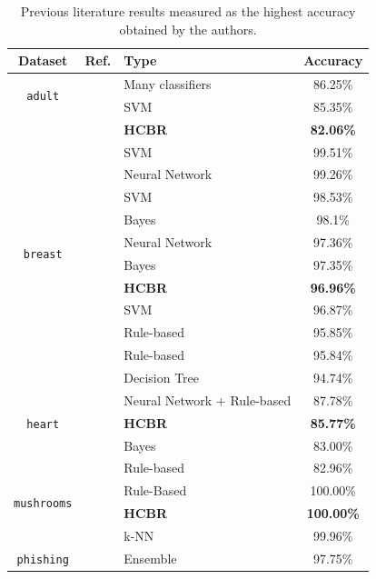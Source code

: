 \documentclass[sigconf,edbt]{acmart-edbt-workshops}
\def\bfHCBR{{\sc \bf HCBR}}
\begin{document}
\begin{table}[tb]
\begin{center}
  \caption{Previous literature results measured as the highest accuracy obtained by the authors.}
  \begin{small}
\begin{tabular}{|c|c|l|c|}
\hline
 Dataset & Ref. & Type & Accuracy   \\ \hline
\multirow{2}{*}{\texttt{adult}} & \cite{kou2012evaluation} & Many classifiers &  86.25\% \\
& \cite{Lee2001} & SVM & 85.35\% \\ 
& & \bfHCBR & {\bf 82.06\%} \\ \hline
 \multirow{10}{*}{\texttt{breast}} & \cite{akay2009support}  & SVM & 99.51\% \\ 
 & \cite{MARCANOCEDENO20119573} & Neural Network & 99.26\% \\ 
 & \cite{POLAT2007694} & SVM & 98.53\% \\ 
 & \cite{fallahi2011expert} & Bayes & 98.1\% \\ 
 & \cite{ubeyli2007implementing} & Neural Network & 97.36\% \\ 
 & \cite{Jiang:2012:LIW:2124637.2124641} & Bayes & 97.35\% \\ 
 & & {\bf \bfHCBR} & {\bf 96.96\%} \\
 & \cite{CHEN20119014} & SVM & 96.87\% \\
 & \cite{doi:10.1504/IJBISE.2016.081590} & Rule-based & 95.85\% \\
 & \cite{HADI2017287} & Rule-based & 95.84\% \\
 & \cite{quinlan1996improved} & Decision Tree & 94.74\% \\ \hline
 \multirow{3}{*}{\texttt{heart}} & \cite{sagir2017hybridised} & Neural Network + Rule-based & 87.78\%\\
 & & {\bf \bfHCBR} & {\bf 85.77\%} \\
 & \cite{Jiang:2012:LIW:2124637.2124641} & Bayes & 83.00\% \\ 
 & \cite{doi:10.1504/IJBISE.2016.081590} & Rule-based & 82.96\% \\ \hline
 \multirow{2}{*}{\texttt{mushrooms}} &  \cite{HADI2017287} & Rule-Based & 100.00\% \\ 
  & & {\bf \bfHCBR} & {\bf 100.00\%} \\
  & \cite{Das:2001:FWB:645530.658297} & k-NN & 99.96\% \\ \hline
 \multirow{3}{*}{\texttt{phishing}} & \cite{7881507} & Ensemble & 97.75\% \\ 

\end{tabular}
\end{small}
\end{center}
\end{table}
\end{document}
